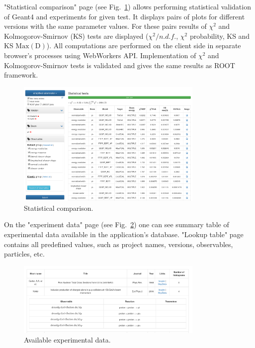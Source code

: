 "Statistical comparison" page (see Fig.~\ref{fig:statcomparison}) allows performing statistical validation of Geant4 and experiments for given test. It displays pairs of plots for different versions with the same parameter values. For these pairs results of $\chi^2$ and Kolmogorov-Smirnov (KS) tests are displayed ($\chi^2/n.d.f.$, $\chi^2$ probability, KS and KS $\mathrm{Max(D)}$). All computations are performed on the client side in separate browser's processes using WebWorkers API. Implementation of $\chi^2$ and Kolmogorov-Smirnov tests is validated and gives the same results as ROOT framework.

\begin{figure}[h]
    \centering
    \includegraphics[width=0.8\textwidth,clip]{statcomparison.png}
    \caption{Statistical comparison.}
    \label{fig:statcomparison}
\end{figure}

On the "experiment data" page (see Fig.~\ref{fig:exppage}) one can see summary table of experimental data available in the application's database.
"Lookup table" page contains all predefined values, such as project names, versions, observables, particles, etc.

\begin{figure}[h]
    \centering
    \includegraphics[width=0.8\textwidth,clip]{expdata.png}
    \caption{Available experimental data.}
    \label{fig:exppage}
\end{figure}

